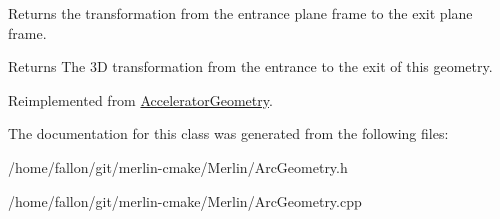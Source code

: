 Returns the transformation from the entrance plane frame to the exit plane frame. \begin{DoxyReturn}{Returns}
The 3D transformation from the entrance to the exit of this geometry. 
\end{DoxyReturn}


Reimplemented from \hyperlink{classAcceleratorGeometry_a9bffb8262fc3b28195e1e25fbfb2b8ba}{Accelerator\+Geometry}.



The documentation for this class was generated from the following files\+:\begin{DoxyCompactItemize}
\item 
/home/fallon/git/merlin-\/cmake/\+Merlin/Arc\+Geometry.\+h\item 
/home/fallon/git/merlin-\/cmake/\+Merlin/Arc\+Geometry.\+cpp\end{DoxyCompactItemize}
